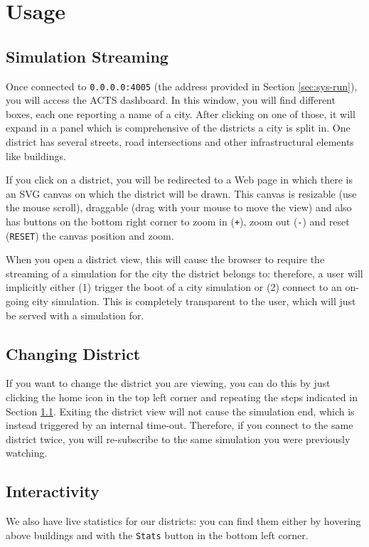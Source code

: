 \section{Usage}

\subsection{Simulation Streaming}\label{sec:usage-stream}

Once connected to \texttt{0.0.0.0:4005} (the address provided in Section
\ref{sec:sys-run}), you will access the ACTS dashboard. In this window, you
will find different boxes, each one reporting a name of a city.
After clicking on one of those, it will expand in a panel which is
comprehensive of the districts a city is split in.
One district has several streets, road intersections and other infrastructural
elements like buildings.

If you click on a district, you will be redirected to a Web page in which
there is an SVG canvas on which the district will be drawn.
This canvas is resizable (use the mouse scroll), draggable (drag with your
mouse to move the view) and also has buttons on the bottom right corner to
zoom in (\texttt{+}), zoom out (\texttt{-}) and reset (\texttt{RESET}) the
canvas position and zoom.

When you open a district view, this will cause the browser to require the
streaming of a simulation for the city the district belongs to: therefore, a
user will implicitly either (1) trigger the boot of a city simulation or (2)
connect to an on-going city simulation.
This is completely transparent to the user, which will just be served with a
simulation for.

\subsection{Changing District}

If you want to change the district you are viewing, you can do this by just
clicking the home icon in the top left corner and repeating the steps indicated
in Section \ref{sec:usage-stream}.
Exiting the district view will not cause the simulation end, which is instead
triggered by an internal time-out. Therefore, if you connect to the same
district twice, you will re-subscribe to the same simulation you were
previously watching.

\subsection{Interactivity}
We also have live statistics for our districts: you can find them either by
hovering above buildings and with the \texttt{Stats} button in the bottom left
corner.
